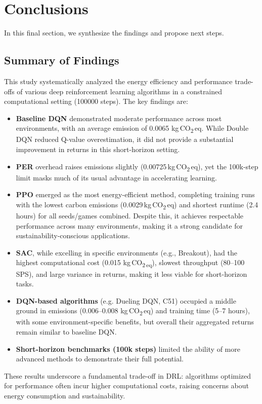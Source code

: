 \section{Conclusions}
\label{sec:conclusions}
In this final section, we synthesize the findings and propose next steps.

\subsection{Summary of Findings}
\label{subsec:summary_of_findings}
This study systematically analyzed the energy efficiency and performance trade-offs of various deep reinforcement learning algorithms in a constrained computational setting (\num{100000} steps). The key findings are:
\begin{itemize}
	\item \textbf{Baseline DQN} demonstrated moderate performance across most environments, with an average emission of \num{0.0065} kg\,CO\textsubscript{2}\,eq. While Double DQN reduced Q-value overestimation, it did not provide a substantial improvement in returns  in this short-horizon setting.
	\item \textbf{PER} overhead raises emissions slightly (\num{0.00725}\,kg\,CO\textsubscript{2}\,eq), yet the 100k-step limit masks much of its usual advantage in accelerating learning.
	\item \textbf{PPO} emerged as the most energy-efficient method, completing training runs with the lowest carbon emissions (\num{0.0029}\,kg\,CO\textsubscript{2}\,eq) and shortest runtime (\num{2.4} hours) for all seeds/games combined. Despite this, it achieves respectable performance across many environments, making it a strong candidate for sustainability-conscious applications.
	\item \textbf{SAC}, while excelling in specific environments (e.g., Breakout), had the highest computational cost (\num{0.015} kg\,CO\textsubscript{2\,eq}), slowest throughput (\num{80}–\num{100} SPS), and large variance in returns, making it less viable for short-horizon tasks.
	\item \textbf{DQN-based algorithms} (e.g. Dueling DQN, C51) occupied a middle ground in emissions (\num{0.006}–\num{0.008} kg\,CO\textsubscript{2}\,eq) and training time (\num{5}–\num{7} hours), with some environment-specific benefits, but overall their aggregated returns remain similar to baseline DQN.
	\item \textbf{Short-horizon benchmarks (100k steps)} limited the ability of more advanced methods to demonstrate their full potential.
\end{itemize}
These results underscore a fundamental trade-off in DRL: algorithms optimized for performance often incur higher computational costs, raising concerns about energy consumption and sustainability.

